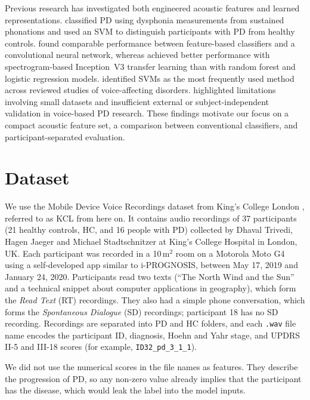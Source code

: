 \documentclass[11pt]{article}
\begin{document}
Previous research has investigated both engineered acoustic features and learned
representations. \citet{Little2009} classified PD using dysphonia measurements from
sustained phonations and used an SVM to distinguish participants with PD from healthy
controls. \citet{Costantini2023} found comparable performance between feature-based
classifiers and a convolutional neural network, whereas \citet{Iyer2023} achieved better
performance with spectrogram-based Inception~V3 transfer learning than with random forest
and logistic regression models. \citet{Idrisoglu2023} identified SVMs as the most
frequently used method across reviewed studies of voice-affecting disorders.
\citet{Malekroodi2025} highlighted limitations involving small datasets and insufficient
external or subject-independent validation in voice-based PD research. These findings
motivate our focus on a compact acoustic feature set, a comparison between conventional
classifiers, and participant-separated evaluation.

\section{Dataset}

We use the Mobile Device Voice Recordings dataset from King's College London
\citep{Trivedi2020}, referred to as KCL from here on. It contains audio recordings of 37
participants (21 healthy controls, HC, and 16 people with PD) collected by Dhaval Trivedi,
Hagen Jaeger and Michael Stadtschnitzer at King's College Hospital in London, UK. Each
participant was recorded in a 10\,m$^2$ room on a Motorola Moto G4 using a self-developed
app similar to i-PROGNOSIS, between May 17, 2019 and January 24, 2020. Participants read
two texts (``The North Wind and the Sun'' and a technical snippet about computer
applications in geography), which form the \emph{Read Text} (RT) recordings. They also had
a simple phone conversation, which forms the \emph{Spontaneous Dialogue} (SD) recordings;
participant 18 has no SD recording. Recordings are separated into PD and HC folders, and
each \texttt{.wav} file name encodes the participant ID, diagnosis, Hoehn and Yahr stage,
and UPDRS II-5 and III-18 scores (for example, \texttt{ID32\_pd\_3\_1\_1}).

We did not use the numerical scores in the file names as features. They describe the
progression of PD, so any non-zero value already implies that the participant has the
disease, which would leak the label into the model inputs.
\end{document}
